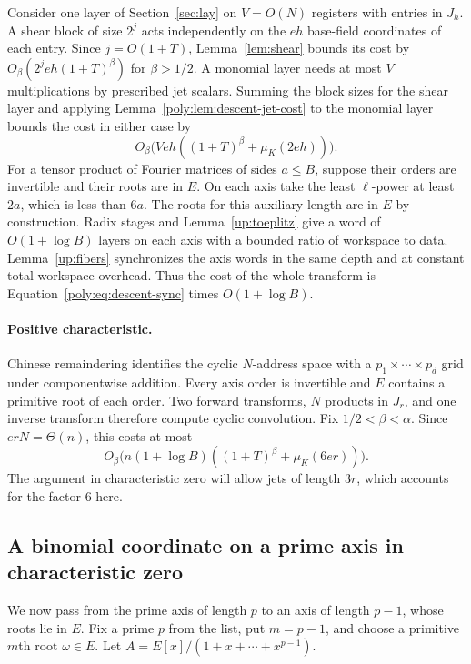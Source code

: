 Consider one layer of Section~\ref{sec:lay} on $V=O(N)$ registers
with entries in $J_h$. A shear block of size $2^j$ acts independently
on the $eh$ base-field coordinates of each entry. Since $j=O(1+T)$,
Lemma~\ref{lem:shear} bounds its cost by
$O_\beta(2^j eh(1+T)^\beta)$ for $\beta>1/2$. A monomial layer needs
at most $V$ multiplications by prescribed jet scalars. Summing the block sizes for the shear layer and applying
Lemma~\ref{poly:lem:descent-jet-cost} to the monomial layer bounds
the cost in either case by
\begin{equation}\label{poly:eq:descent-sync}
 O_\beta\big(Veh((1+T)^\beta+\mu_K(2eh))\big).
\end{equation}
For a tensor product of Fourier matrices of sides $a\le B$, suppose
their orders are invertible and their roots are in $E$. On each axis
take the least $\ell$-power at least $2a$, which is less than $6a$.
The roots for this auxiliary length are in $E$ by construction.
Radix stages and Lemma~\ref{up:toeplitz} give a word of
$O(1+\log B)$ layers on each axis with a bounded ratio of workspace
to data. Lemma~\ref{up:fibers} synchronizes the axis words in the same
depth and at constant total workspace overhead. Thus the cost of the
whole transform is Equation~\eqref{poly:eq:descent-sync} times
$O(1+\log B)$.

\paragraph{Positive characteristic.}
Chinese remaindering identifies the cyclic $N$-address space with a
$p_1\times\cdots\times p_d$ grid under componentwise addition.
Every axis order is invertible and $E$ contains a primitive root of
each order. Two forward transforms, $N$ products in $J_r$, and one
inverse transform therefore compute cyclic convolution. Fix
$1/2<\beta<\alpha$. Since $erN=\Theta(n)$, this costs at most
\begin{equation}\label{poly:eq:descent-cost}
 O_\beta\big(n(1+\log B)((1+T)^\beta+\mu_K(6er))\big).
\end{equation}
The argument in characteristic zero will allow jets of length $3r$,
which accounts for the factor $6$ here.

\subsection{A binomial coordinate on a prime axis in characteristic zero}

We now pass from the prime axis of length $p$ to an axis of length
$p-1$, whose roots lie in $E$.
Fix a prime $p$ from the list, put $m=p-1$, and choose a primitive
$m$th root $\omega\in E$. Let
$A=E[x]/(1+x+\cdots+x^{p-1})$.

